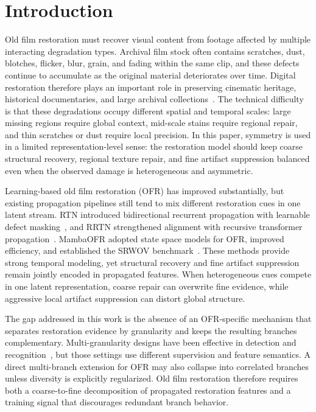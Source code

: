 \documentclass[symmetry,article,submit,pdftex,moreauthors]{Definitions/mdpi}
\begin{document}
%
\section{Introduction}
\label{sec:introduction}

Old film restoration must recover visual content from footage affected by multiple interacting degradation types. Archival film stock often contains scratches, dust, blotches, flicker, blur, grain, and fading within the same clip, and these defects continue to accumulate as the original material deteriorates over time. Digital restoration therefore plays an important role in preserving cinematic heritage, historical documentaries, and large archival collections~\cite{iizuka2019deepremaster}. The technical difficulty is that these degradations occupy different spatial and temporal scales: large missing regions require global context, mid-scale stains require regional repair, and thin scratches or dust require local precision. In this paper, symmetry is used in a limited representation-level sense: the restoration model should keep coarse structural recovery, regional texture repair, and fine artifact suppression balanced even when the observed damage is heterogeneous and asymmetric.

Learning-based old film restoration (OFR) has improved substantially, but existing propagation pipelines still tend to mix different restoration cues in one latent stream. RTN introduced bidirectional recurrent propagation with learnable defect masking~\cite{wan2022rtn}, and RRTN strengthened alignment with recursive transformer propagation~\cite{lin2024rrtn}. MambaOFR adopted state space models for OFR, improved efficiency, and established the SRWOV benchmark~\cite{mao2025mambaofr,gu2024mamba,guo2024mambair}. These methods provide strong temporal modeling, yet structural recovery and fine artifact suppression remain jointly encoded in propagated features. When heterogeneous cues compete in one latent representation, coarse repair can overwrite fine evidence, while aggressive local artifact suppression can distort global structure.

The gap addressed in this work is the absence of an OFR-specific mechanism that separates restoration evidence by granularity and keeps the resulting branches complementary. Multi-granularity designs have been effective in detection and recognition~\cite{lin2017fpn,wang2021hrnet,sun2018pcb,wang2018mgn,gu2025reidmamba}, but those settings use different supervision and feature semantics. A direct multi-branch extension for OFR may also collapse into correlated branches unless diversity is explicitly regularized. Old film restoration therefore requires both a coarse-to-fine decomposition of propagated restoration features and a training signal that discourages redundant branch behavior.
\end{document}
